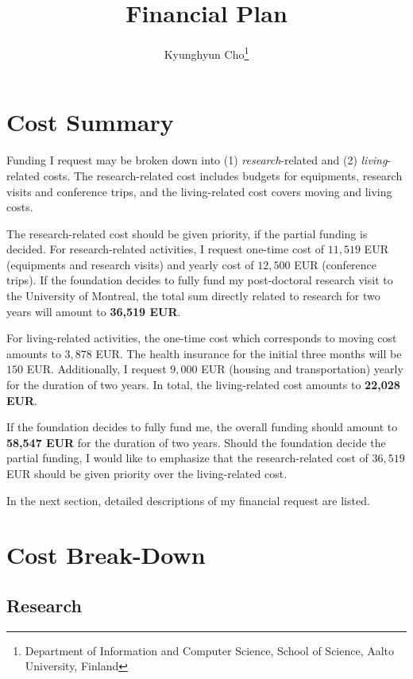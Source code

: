 \documentclass[11pt, oneside]{essay}
\title{Financial Plan}
\author{Kyunghyun Cho\thanks{Department of Information and
    Computer Science, School of Science, Aalto University,
             Finland}}
\begin{document}
\vspace{20mm}

\maketitle

\tableofcontents

\vfill

\newpage

\section{Cost Summary}

Funding I request may be broken down into (1)
\textit{research}-related and (2) \textit{living}-related
costs. The research-related cost includes budgets for equipments,
research visits and conference trips, and the living-related
cost covers moving and living costs.

The research-related cost should be given priority, if the
partial funding is decided. For research-related activities, I
request one-time cost of $11,519$ EUR (equipments and research
visits) and yearly cost of $12,500$ EUR (conference trips). If
the foundation decides to fully fund my post-doctoral research
visit to the University of Montreal, the total sum directly
related to research for two years will amount to \textbf{36,519
EUR}.

For living-related activities, the one-time cost which
corresponds to moving cost amounts to $3,878$ EUR. The health
insurance for the initial three months will be $150$ EUR.
Additionally, I request $9,000$ EUR (housing and transportation)
yearly for the duration of two years. In total, the
living-related cost amounts to \textbf{22,028 EUR}.

If the foundation decides to fully fund me, the overall funding
should amount to \textbf{58,547 EUR} for the duration of two
years. Should the foundation decide the partial funding, I would
like to emphasize that the research-related cost of $36,519$ EUR
should be given priority over the living-related cost.

In the next section, detailed descriptions of my financial
request are listed.


\section{Cost Break-Down}

\subsection{Research}
\end{document}
